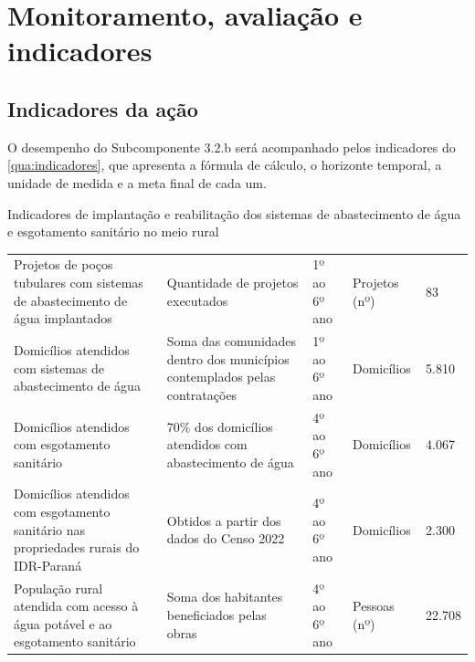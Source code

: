 \section{Monitoramento, avaliação e indicadores}
\label{sec:monitoramento}

\subsection{Indicadores da ação}

O desempenho do Subcomponente 3.2.b será acompanhado pelos indicadores do
\autoref{qua:indicadores}, que apresenta a fórmula de cálculo, o horizonte
temporal, a unidade de medida e a meta final de cada um.

\begin{quadro}[htbp]
\caption{Indicadores de implantação e reabilitação dos sistemas de abastecimento de água e esgotamento sanitário no meio rural}
\label{qua:indicadores}
\footnotesize
\renewcommand{\arraystretch}{1.25}
\begin{tabularx}{\textwidth}{|L|L|Q{1.6cm}|P{2.2cm}|Q{1.4cm}|}
\hline
{} &  &  &
 &  \\ \hline
Projetos de poços tubulares com sistemas de abastecimento de água implantados &
Quantidade de projetos executados & 1º ao 6º ano & Projetos (nº) & 83 \\ \hline
Domicílios atendidos com sistemas de abastecimento de água &
Soma das comunidades dentro dos municípios contemplados pelas contratações &
1º ao 6º ano & Domicílios & 5.810 \\ \hline
Domicílios atendidos com esgotamento sanitário &
70\% dos domicílios atendidos com abastecimento de água &
4º ao 6º ano & Domicílios & 4.067 \\ \hline
Domicílios atendidos com esgotamento sanitário nas propriedades rurais do IDR-Paraná &
Obtidos a partir dos dados do Censo 2022 & 4º ao 6º ano & Domicílios & 2.300 \\ \hline
População rural atendida com acesso à água potável e ao esgotamento sanitário &
Soma dos habitantes beneficiados pelas obras & 4º ao 6º ano &
Pessoas (nº) & 22.708 \\ \hline
\end{tabularx}
\end{quadro}

